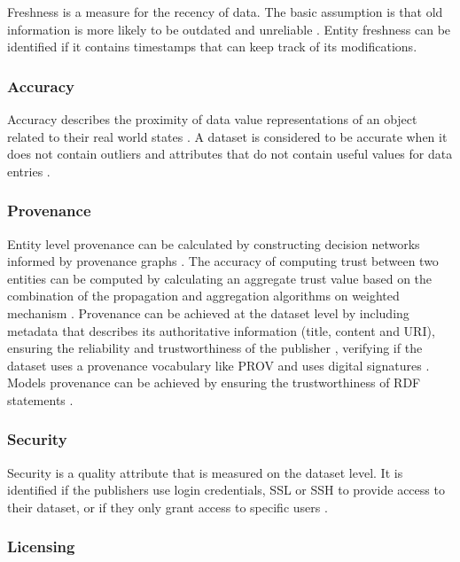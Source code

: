 \documentclass[onecolumn, crcready]{iosart2c}
\begin{document}
Freshness is a measure for the recency of data. The basic assumption is that old information is more likely to be outdated and unreliable \cite{Flouris2012}. Entity freshness can be identified if it contains timestamps that can keep track of its modifications.

\subsubsection{Accuracy}

Accuracy describes the proximity of data value representations of an object related to their real world states \cite{Furber2011a}. A dataset is considered to be accurate when it does not contain outliers and attributes that do not contain useful values for data entries \cite{Framework2012}.

\subsubsection{Provenance}

Entity level provenance can be calculated by constructing decision networks informed by provenance graphs \cite{Gamble2011}. The accuracy of computing trust between two entities \cite{Framework2012} can be computed by calculating an aggregate trust value based on the combination of the propagation and aggregation algorithms on weighted mechanism \cite{j.websem208}. Provenance can be achieved at the dataset level by including metadata that describes its authoritative information (title, content and URI), ensuring the reliability and trustworthiness of the publisher \cite{Flouris2012}, verifying if the dataset uses a provenance vocabulary like PROV \cite{w3c-prov-o} and uses digital signatures \cite{Framework2012}. \\ Models provenance can be achieved by ensuring the trustworthiness of RDF statements \cite{Hartig09usingweb}. 

\subsubsection{Security}

Security is a quality attribute that is measured on the dataset level. It is identified if the publishers use login credentials, SSL or SSH to provide access to their dataset, or if they only grant access to specific users \cite{Framework2012}.

\subsubsection{Licensing}
\end{document}

